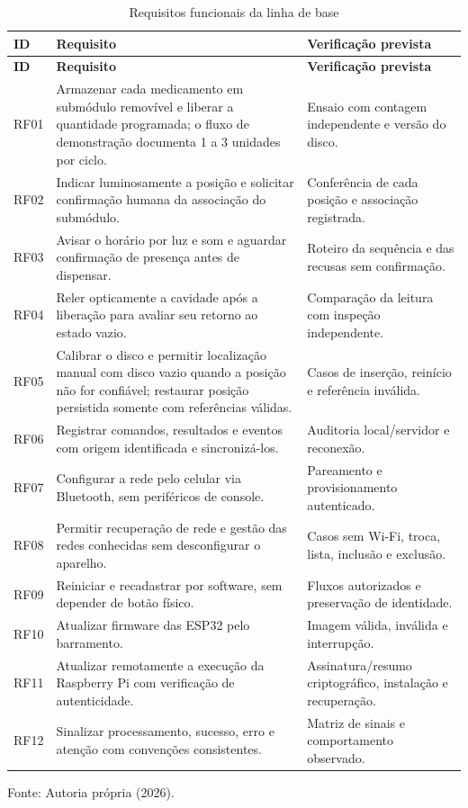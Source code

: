 {\small\setlength{\tabcolsep}{3pt}\begin{longtable}{p{}p{}p{}}\caption{Requisitos funcionais da linha de base}\label{tab:05-1}\\
\hline
\textbf{ID} & \textbf{Requisito} & \textbf{Verificação prevista}\\\hline
\endfirsthead\hline
\textbf{ID} & \textbf{Requisito} & \textbf{Verificação prevista}\\\hline
\endhead
RF01 & Armazenar cada medicamento em submódulo removível e liberar a quantidade programada; o fluxo de demonstração documenta 1 a 3 unidades por ciclo. & Ensaio com contagem independente e versão do disco.\\\hline
RF02 & Indicar luminosamente a posição e solicitar confirmação humana da associação do submódulo. & Conferência de cada posição e associação registrada.\\\hline
RF03 & Avisar o horário por luz e som e aguardar confirmação de presença antes de dispensar. & Roteiro da sequência e das recusas sem confirmação.\\\hline
RF04 & Reler opticamente a cavidade após a liberação para avaliar seu retorno ao estado vazio. & Comparação da leitura com inspeção independente.\\\hline
RF05 & Calibrar o disco e permitir localização manual com disco vazio quando a posição não for confiável; restaurar posição persistida somente com referências válidas. & Casos de inserção, reinício e referência inválida.\\\hline
RF06 & Registrar comandos, resultados e eventos com origem identificada e sincronizá-los. & Auditoria local/servidor e reconexão.\\\hline
RF07 & Configurar a rede pelo celular via Bluetooth, sem periféricos de console. & Pareamento e provisionamento autenticado.\\\hline
RF08 & Permitir recuperação de rede e gestão das redes conhecidas sem desconfigurar o aparelho. & Casos sem Wi-Fi, troca, lista, inclusão e exclusão.\\\hline
RF09 & Reiniciar e recadastrar por software, sem depender de botão físico. & Fluxos autorizados e preservação de identidade.\\\hline
RF10 & Atualizar firmware das ESP32 pelo barramento. & Imagem válida, inválida e interrupção.\\\hline
RF11 & Atualizar remotamente a execução da Raspberry Pi com verificação de autenticidade. & Assinatura/resumo criptográfico, instalação e recuperação.\\\hline
RF12 & Sinalizar processamento, sucesso, erro e atenção com convenções consistentes. & Matriz de sinais e comportamento observado.\\\hline
\end{longtable}}{\small\noindent Fonte: Autoria própria (2026).\par}


